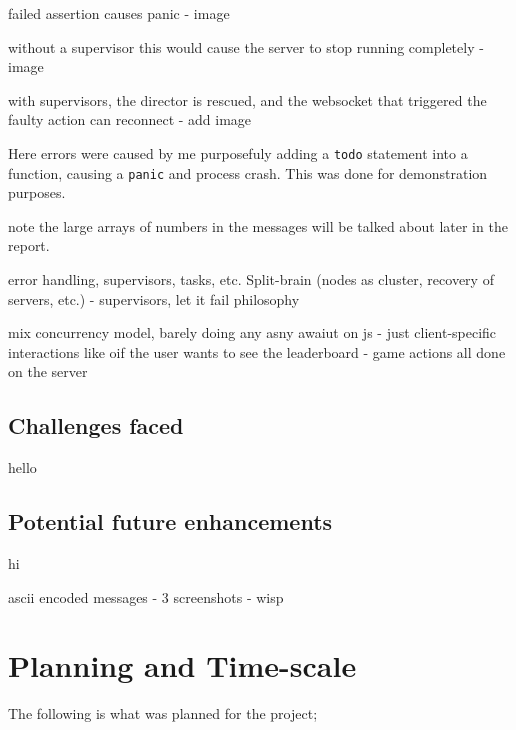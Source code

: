 \documentclass[]{final}
\begin{document}
failed assertion causes panic - image

without a supervisor this would cause the server to stop running completely - image

with supervisors, the director is rescued, and the websocket that triggered
the faulty action can reconnect - add image

Here errors were caused by me purposefuly adding a \lstinline|todo| statement
into a function, causing a \lstinline|panic| and process crash. This was done
for demonstration purposes.

note the large arrays of numbers in the messages will be talked about later in
the report.

error handling, supervisors, tasks, etc.
Split-brain (nodes as cluster, recovery of servers, etc.) - supervisors, let
it fail philosophy

mix concurrency model, barely doing any asny awaiut on js - just client-specific
interactions like oif the user wants to see the leaderboard - game actions all
done on the server

\section{Challenges faced}
hello%
\section{Potential future enhancements}
hi%

ascii encoded messages - 3 screenshots - wisp

\chapter{Planning and Time-scale}

The following is what was planned for the project;
\end{document}
